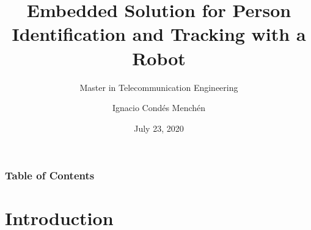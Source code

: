 \documentclass[11pt]{beamer}
\begin{document}
 
	\author{Ignacio Condés Menchén}
	\title{Embedded Solution for Person Identification and Tracking with a Robot}
	\subtitle{Master in Telecommunication Engineering}
	\date{July 23, 2020}

\begin{frame}[plain]
	\maketitle
\end{frame}

\begin{frame}
	\frametitle{Table of Contents}
	\tableofcontents
\end{frame}

\section{Introduction}
\end{document}
